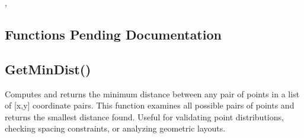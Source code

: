 \documentclass[letterpaper,10pt,english]{sphinxmanual}
\begin{document}
\sphinxAtStartPar
{}

\begin{sphinxVerbatim}[commandchars=\\\{\}]
\end{sphinxVerbatim}

\sphinxAtStartPar
{}

\begin{sphinxVerbatim}[commandchars=\\\{\}]
\PYG{p}{[}\PYG{p}{[}\PYG{p}{]}\PYG{p}{[}\PYG{p}{]}\PYG{p}{]}
\end{sphinxVerbatim}

\sphinxAtStartPar
{}

\sphinxAtStartPar
{}, 


\subsection{Functions Pending Documentation}
\label{\detokenize{reference/graphics:functions-pending-documentation}}
\ignorespaces 

\subsection{GetMinDist()}
\label{\detokenize{reference/graphics:getmindist}}\label{\detokenize{reference/graphics:index-21}}
\sphinxAtStartPar
{}

\sphinxAtStartPar
{}

\sphinxAtStartPar
Computes and returns the minimum distance between any pair of points in a list of {[}x,y{]} coordinate pairs. This function examines all possible pairs of points and returns the smallest distance found. Useful for validating point distributions, checking spacing constraints, or analyzing geometric layouts.
\end{document}
